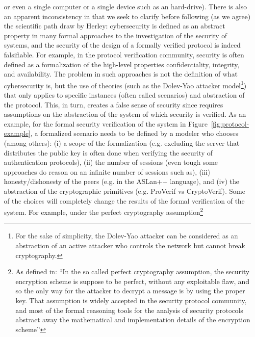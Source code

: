 or even a single computer or a single device such as an hard-drive).  There is
also an apparent inconsistency in\autocite{Herley2016unfalsifiability} that we
seek to clarify before following (as we agree) the scientific path draw by
Herley: cybersecurity is defined as an abstract property in many formal
approaches to the investigation of the security of systems, and the security of the design of a
formally verified protocol is indeed falsifiable.  For example, in the protocol
verification community, security is often defined as a formalization of the
high-level properties confidentiality, integrity, and availability. The problem
in such approaches is not the definition of what cybersecurity is, but the use
of theories (such as the Dolev-Yao attacker model\footnote{For the sake of
simplicity, the Dolev-Yao attacker can be considered as an abstraction of an
active attacker who controls the network but cannot break
cryptography.}\autocite{Dolev1983security})
that only applies to specific instances (often called scenarios) and
abstraction of the protocol. This, in turn, creates a false sense of security
since requires assumptions on the abstraction of the system of which security
is verified. As an example, for the formal security verification of the system
in Figure~\ref{fig:protocol-example}, a formalized scenario needs to be defined
by a modeler who chooses (among others): (i) a scope of the formalization (e.g.
excluding the server that distributes the public key is often done when
verifying the security of authentication protocols), (ii) the number of
sessions (even tough some approaches do reason on an infinite number of
sessions such as\autocite{Escobar2007maudenpa}), (iii) honesty/dishonesty of
the peers (e.g.  in the ASLan++ language\autocite{Oheimb2010aslan++}), and (iv)
the abstraction of the cryptographic primitives (e.g.  ProVerif vs
CryptoVerif\autocite{Blanchet2017symbolic}).  Some of the choices will
completely change the results of the formal verification of the system. For
example, under the perfect cryptography assumption\footnote{As defined
in\autocite{Rocchetto2016cpdy}: ``In the so called perfect cryptography
assumption, the security encryption scheme is suppose to be perfect, without
any exploitable flaw, and so the only way for the attacker to decrypt a message
is by using the proper key. That assumption is widely accepted in the security
protocol community, and most of the formal reasoning tools for the analysis of
security protocols abstract away the mathematical and implementation details of
the encryption
scheme\autocite{Turuani2006clatse,Basin2005ofmc,Armando2016satmc,Rocchetto2017interpolation}''}
